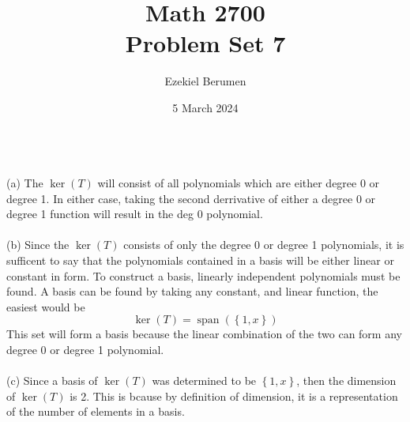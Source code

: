 \documentclass{report}
\title{\Huge{Math 2700}\\Problem Set 7}
\author{\huge{Ezekiel Berumen}}
\date{5 March 2024}
\begin{document}
\maketitle
\newpage

\sol \\
\noindent (a) The $\operatorname{ker}(T)$ will consist of all polynomials which are either degree 0 or degree 1.  In either case,  taking the second derrivative of either a degree 0 or degree 1 function will result in the deg 0 polynomial.  \\
\\ 
\noindent(b) Since the $\operatorname{ker}(T)$ consists of only the degree 0 or degree 1 polynomials,  it is sufficent to say that the polynomials contained in a basis will be either linear or constant in form.  To construct a basis,  linearly independent polynomials must be found.  A basis can be found by taking any constant, and linear function,  the easiest would be
$$
\operatorname{ker}(T) = \operatorname{span}\left(\left\{1, x\right\}\right)
$$
This set will form a basis because the linear combination of the two can form any degree 0 or degree 1 polynomial.  \\
\\
\noindent(c) Since a basis of $\operatorname{ker}(T)$ was determined to be $\left\{1,x\right\}$,  then the dimension of $\operatorname{ker}(T)$ is 2.  This is bcause by definition of dimension,  it is a representation of the number of elements in a basis.
\end{document}
